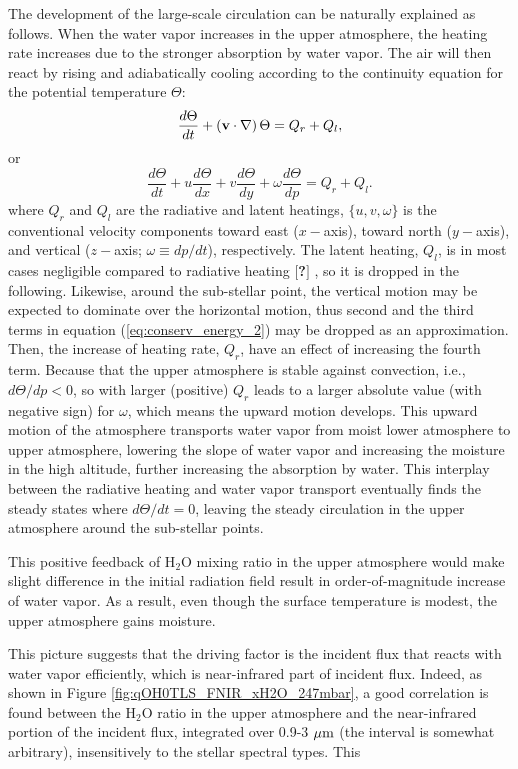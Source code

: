 \documentclass[11pt,numberedappendix,twocolappendix,]{emulateapj}
\def\water{H$_2$O }
\def\memo#1{\color{red}$[${\bf #1}$]$ \color{black}}
\begin{document}
The development of the large-scale circulation can be naturally explained as follows. 
When the water vapor increases in the upper atmosphere, the heating rate increases due to the stronger absorption by water vapor. 
The air will then react by rising and adiabatically cooling according to the continuity equation for the potential temperature $\Theta $:
\begin{equation}
\frac{d\Theta }{dt} + ( {\bf v} \cdot \nabla ) \, \Theta = Q_r + Q_l, \label{eq:conserv_energy}
\end{equation}
or
\begin{equation}
\frac{d\Theta }{dt} + u \frac{d\Theta }{dx} + v \frac{d\Theta }{dy} + \omega \frac{d\Theta }{dp} = Q_r + Q_l. \label{eq:conserv_energy_2}
\end{equation}
where $Q_r$ and $Q_l$ are the radiative and latent heatings, $\{ u, v, \omega \}$ is the conventional velocity components toward east ($x-$axis), toward north ($y-$axis), and vertical ($z-$axis; $\omega \equiv  dp/dt$), respectively. 
The latent heating, $Q_l$, is in most cases negligible compared to radiative heating \memo{?}, so it is dropped in the following. 
Likewise, around the sub-stellar point, the vertical motion may be expected to dominate over the horizontal motion, thus second and the third terms in equation (\ref{eq:conserv_energy_2}) may be dropped as an approximation. 
Then, the increase of heating rate, $Q_r$, have an effect of increasing the fourth term. 
Because that the upper atmosphere is stable against convection, i.e., $d \Theta / d p < 0 $, so with larger (positive) $Q_r$ leads to a larger absolute value (with negative sign) for $\omega $, which means the upward motion develops. 
This upward motion of the atmosphere transports water vapor from moist lower atmosphere to upper atmosphere, lowering the slope of water vapor and increasing the moisture in the high altitude, further increasing the absorption by water. 
This interplay between the radiative heating and water vapor transport eventually finds the steady states where $d\Theta/dt = 0$, leaving the steady circulation in the upper atmosphere around the sub-stellar points. 

This positive feedback of \water mixing ratio in the upper atmosphere would make slight difference in the initial radiation field result in order-of-magnitude increase of water vapor. 
As a result, even though the surface temperature is modest, the upper atmosphere gains moisture.  

This picture suggests that the driving factor is the incident flux that reacts with water vapor efficiently, which is near-infrared part of incident flux. 
Indeed, as shown in Figure \ref{fig:qOH0TLS_FNIR_xH2O_247mbar}, a good correlation is found between the \water ratio in the upper atmosphere and the near-infrared portion of the incident flux, integrated over 0.9-3 $\mu {\rm m}$ (the interval is somewhat arbitrary), insensitively to the stellar spectral types. 
This 
\end{document}
